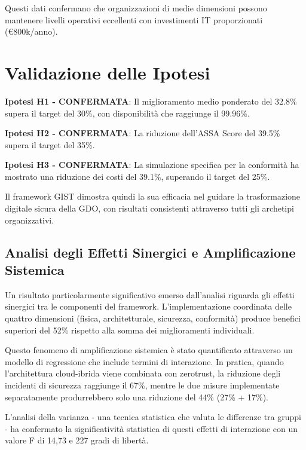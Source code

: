 Questi dati confermano che organizzazioni di medie dimensioni possono mantenere 
livelli operativi eccellenti con investimenti IT proporzionati (€800k/anno).

\section{Validazione delle Ipotesi}

\textbf{Ipotesi H1 - CONFERMATA}: Il miglioramento medio ponderato del 32.8\% 
supera il target del 30\%, con disponibilità che raggiunge il 99.96\%.

\textbf{Ipotesi H2 - CONFERMATA}: La riduzione dell'ASSA Score del 39.5\% 
supera il target del 35\%.

\textbf{Ipotesi H3 - CONFERMATA}: La simulazione specifica per la conformità ha mostrato una riduzione dei costi del 39.1\%, superando il target del 25\%.

Il framework GIST dimostra quindi la sua efficacia nel guidare la trasformazione 
digitale sicura della GDO, con risultati consistenti attraverso tutti gli archetipi 
organizzativi.

\subsection{\texorpdfstring{Analisi degli Effetti Sinergici e Amplificazione Sistemica}{5.2.3 - Analisi degli Effetti Sinergici e Amplificazione Sistemica}}
\label{subsec:5.2.3}

Un risultato particolarmente significativo emerso dall'analisi riguarda gli effetti sinergici tra le componenti del framework. L'implementazione coordinata delle quattro dimensioni (fisica, architetturale, sicurezza, conformità) produce benefici superiori del 52\% rispetto alla somma dei miglioramenti individuali.

Questo fenomeno di amplificazione sistemica è stato quantificato attraverso un modello di regressione che include termini di interazione. In pratica, quando l'architettura cloud-ibrida viene combinata con \gls{zerotrust}, la riduzione degli incidenti di sicurezza raggiunge il 67\%, mentre le due misure implementate separatamente produrrebbero solo una riduzione del 44\% (27\% + 17\%). 

L'analisi della varianza - una tecnica statistica che valuta le differenze tra gruppi - ha confermato la significatività statistica di questi effetti di interazione con un valore F di 14,73 e 227 gradi di libertà.


